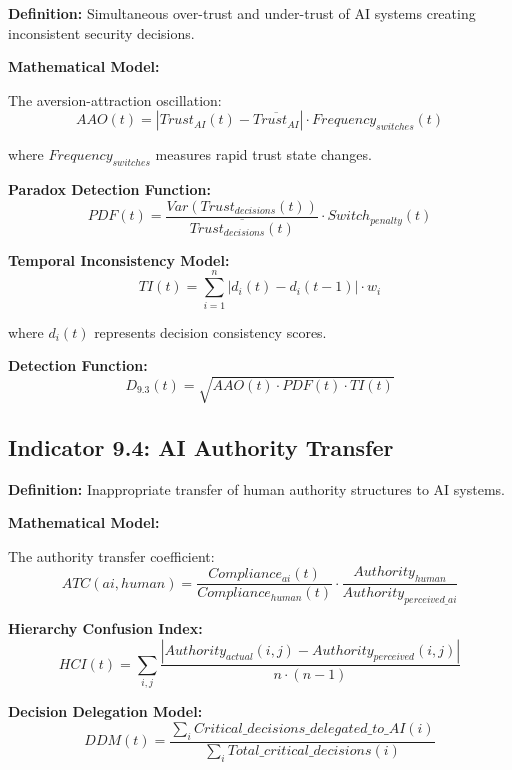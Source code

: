 \documentclass[11pt,a4paper]{article}
\begin{document}
\textbf{Definition:} Simultaneous over-trust and under-trust of AI systems creating inconsistent security decisions.

\textbf{Mathematical Model:}

The aversion-attraction oscillation:
\begin{equation}
AAO(t) = |Trust_{AI}(t) - \overline{Trust_{AI}}| \cdot Frequency_{switches}(t)
\end{equation}

where $Frequency_{switches}$ measures rapid trust state changes.

\textbf{Paradox Detection Function:}
\begin{equation}
PDF(t) = \frac{Var(Trust_{decisions}(t))}{\overline{Trust_{decisions}(t)}} \cdot Switch_{penalty}(t)
\end{equation}

\textbf{Temporal Inconsistency Model:}
\begin{equation}
TI(t) = \sum_{i=1}^{n} |d_i(t) - d_i(t-1)| \cdot w_i
\end{equation}

where $d_i(t)$ represents decision consistency scores.

\textbf{Detection Function:}
\begin{equation}
D_{9.3}(t) = \sqrt{AAO(t) \cdot PDF(t) \cdot TI(t)}
\end{equation}

\subsection{Indicator 9.4: AI Authority Transfer}

\textbf{Definition:} Inappropriate transfer of human authority structures to AI systems.

\textbf{Mathematical Model:}

The authority transfer coefficient:
\begin{equation}
ATC(ai,human) = \frac{Compliance_{ai}(t)}{Compliance_{human}(t)} \cdot \frac{Authority_{human}}{Authority_{perceived\_ai}}
\end{equation}

\textbf{Hierarchy Confusion Index:}
\begin{equation}
HCI(t) = \sum_{i,j} \frac{|Authority_{actual}(i,j) - Authority_{perceived}(i,j)|}{n \cdot (n-1)}
\end{equation}

\textbf{Decision Delegation Model:}
\begin{equation}
DDM(t) = \frac{\sum_{i} Critical\_decisions\_delegated\_to\_AI(i)}{\sum_{i} Total\_critical\_decisions(i)}
\end{equation}
\end{document}
